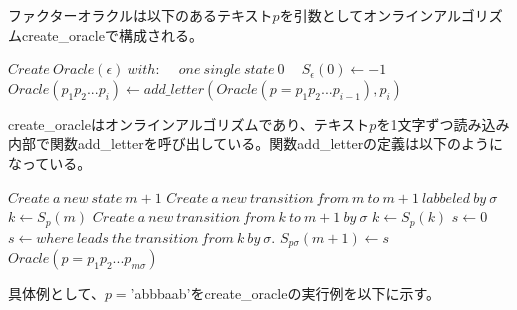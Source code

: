 \documentclass[11pt,a4paper]{jreport}
\begin{document}
  ファクターオラクルは以下のあるテキスト$p$を引数としてオンラインアルゴリズムcreate\_oracleで構成される。
  \begin{algorithm}
    \caption{$\textbf{create\_oracle}(p=p_1p_2...p_m)$}
    \label{alg1}
    \begin{algorithmic}[1]
      \State $Create\ Oracle(\epsilon)\ with:$
      \State $\ \ \ \ one\ single\ state\ 0$
      \State $\ \ \ \ S_\epsilon(0) \leftarrow -1$
      \State $Oracle(p_1p_2...p_i) \leftarrow add\_letter(Oracle(p=p_1p_2...p_{i-1}), p_i)$
      \EndFor
    \end{algorithmic}
  \end{algorithm}
  
  create\_oracleはオンラインアルゴリズムであり、テキスト$p$を1文字ずつ読み込み内部で関数add\_letterを呼び出している。関数add\_letterの定義は以下のようになっている。

  \begin{algorithm}
    \caption{$\textbf{add\_letter}(Oracle(p=p_1p_2...p_m), \sigma)$}
    \label{alg2}
    \begin{algorithmic}[1]
      \State $Create\ a\ new\ state\ m+1$
      \State $Create\ a\ new\ transition\ from\ m\ to\ m+1\ labbeled\ by\ \sigma$
      \State $k \leftarrow S_p(m)$
      \State $Create\ a\ new\ transition\ from\ k\ to\ m+1\ by\ \sigma$
      \State $k \leftarrow S_p(k)$
      \EndWhile
      \State $s \leftarrow 0$
      \Else
      \State $s \leftarrow where\ leads\ the\ transition\ from\ k\ by\ \sigma.$
      \EndIf
      \State $S_{p\sigma}(m+1) \leftarrow s$
      \Return $Oracle(p=p_1p_2...p_{m\sigma})$
    \end{algorithmic}
  \end{algorithm}

  具体例として、$p=$'abbbaab'をcreate\_oracleの実行例を以下に示す。
  \newpage
\end{document}
